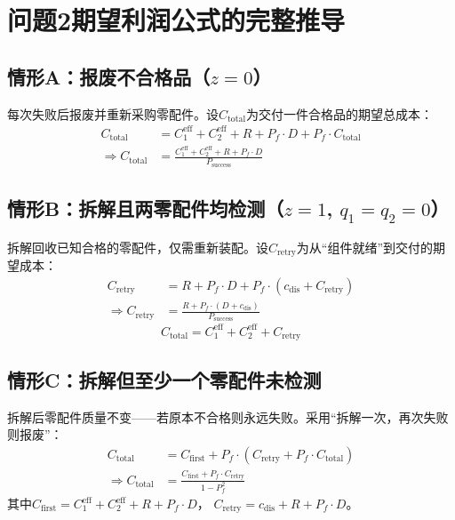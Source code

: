\documentclass[12pt,a4paper]{ctexart}
\begin{document}
\section{问题2期望利润公式的完整推导}

\subsection*{情形A：报废不合格品（$z=0$）}

每次失败后报废并重新采购零配件。设$C_{\text{total}}$为交付一件合格品的期望总成本：
\begin{align}
    C_{\text{total}} &= C_1^{\text{eff}} + C_2^{\text{eff}} + R + P_f \cdot D + P_f \cdot C_{\text{total}} \\
    \Rightarrow C_{\text{total}} &= \frac{C_1^{\text{eff}} + C_2^{\text{eff}} + R + P_f \cdot D}{P_{\text{success}}}
\end{align}

\subsection*{情形B：拆解且两零配件均检测（$z=1$, $q_1=q_2=0$）}

拆解回收已知合格的零配件，仅需重新装配。设$C_{\text{retry}}$为从``组件就绪''到交付的期望成本：
\begin{align}
    C_{\text{retry}} &= R + P_f \cdot D + P_f \cdot (c_{\text{dis}} + C_{\text{retry}}) \\
    \Rightarrow C_{\text{retry}} &= \frac{R + P_f \cdot (D + c_{\text{dis}})}{P_{\text{success}}}
\end{align}
\begin{equation}
    C_{\text{total}} = C_1^{\text{eff}} + C_2^{\text{eff}} + C_{\text{retry}}
\end{equation}

\subsection*{情形C：拆解但至少一个零配件未检测}

拆解后零配件质量不变——若原本不合格则永远失败。采用``拆解一次，再次失败则报废''：
\begin{align}
    C_{\text{total}} &= C_{\text{first}} + P_f \cdot (C_{\text{retry}} + P_f \cdot C_{\text{total}}) \\
    \Rightarrow C_{\text{total}} &= \frac{C_{\text{first}} + P_f \cdot C_{\text{retry}}}{1 - P_f^2}
\end{align}
其中$C_{\text{first}} = C_1^{\text{eff}} + C_2^{\text{eff}} + R + P_f \cdot D$，
$C_{\text{retry}} = c_{\text{dis}} + R + P_f \cdot D$。
\end{document}
